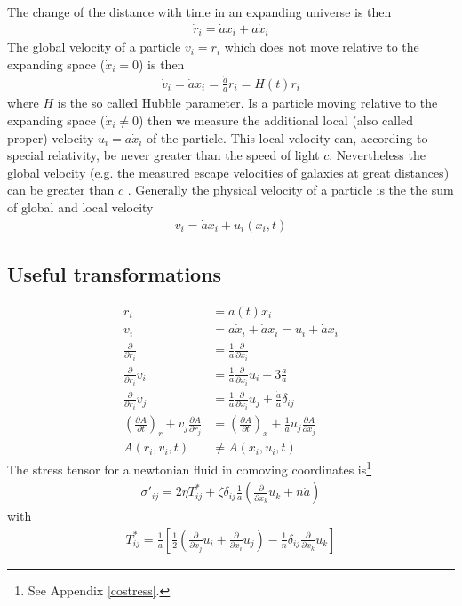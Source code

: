 \documentclass[a4paper,
					12pt,
					twoside,
					openright
					]{book}
\newcommand{\lra}[1]{{ \left( #1 \right) }}
\newcommand{\lrb}[1]{{ \left[ #1 \right] }}
\newcommand{\pd}[1]{\frac{\partial}{\partial #1}}
\newcommand{\fa}{\frac{1}{a}}
\newcommand{\fh}{\frac{\dot{a}}{a}}
\begin{document}
The change of the distance with time in an expanding universe is then
\begin{align}
\dot{r}_i = \dot{a} x_i + a \dot{x}_i  
\end{align}
The global velocity of a particle $v_i = \dot{r}_i$ which does not move 
relative to the expanding space ($\dot{x}_i = 0$) is then
\begin{align}
\dot{v}_i = \dot{a} x_i = \fh r_i = H(t) r_i 
\end{align}
where $H$ is the so called Hubble parameter. Is a particle moving relative to
the expanding space ($\dot{x}_i \neq 0$) then we measure the additional 
local (also called proper) velocity $u_i = a \dot{x}_i$ of the particle. This local
velocity can, according to special relativity, be never greater than the speed of light
$c$. Nevertheless the global velocity (e.g. the measured escape velocities of galaxies at 
great distances) can be greater than $c$ \citep{Davis2004}. Generally the physical velocity 
of a particle is the the sum of global and local velocity
\begin{align}
v_i = \dot{a} x_i + u_i (x_i,t)
\end{align}



\subsection{Useful transformations}
\begin{align}
r_i&=a(t) x_i\\
v_i&= a \dot{x}_i + \dot{a} x_i = u_i + \dot{a} x_i\\
\pd{r_i}&=\fa\pd{x_i}\\
\pd{r_i}v_i&=\fa\pd{x_i}u_i+3\fh\label{eq:cotrans4}\\
\pd{r_i}v_j&=\fa\pd{x_i}u_j + \fh\delta_{ij} \label{eq:cotrans5}\\
\lra{\frac{\partial A}{\partial t}}_r+v_j \frac{\partial A}{\partial r_j} &= 
\lra{\frac{\partial A}{\partial t}}_x+\fa u_j \frac{\partial A}{\partial
x_j}\\
A(r_i,v_i,t) &\neq A(x_i,u_i,t)
\end{align}
The stress tensor for a newtonian fluid in comoving coordinates is\footnote{See
Appendix \ref{costress}.}
\begin{align}
\sigma'_{ij}=2\eta T^*_{ij}+\zeta\delta_{ij}\fa\lra{\pd{x_k}u_k+n\dot{a}}
\end{align}
with 
\begin{align}
T^*_{ij}=\fa\lrb{\frac{1}{2}\lra{\pd{x_j}u_i+\pd{x_i}u_j}
-\frac{1}{n}\delta_{ij}\pd{x_k}u_k}
\end{align}
\end{document}
